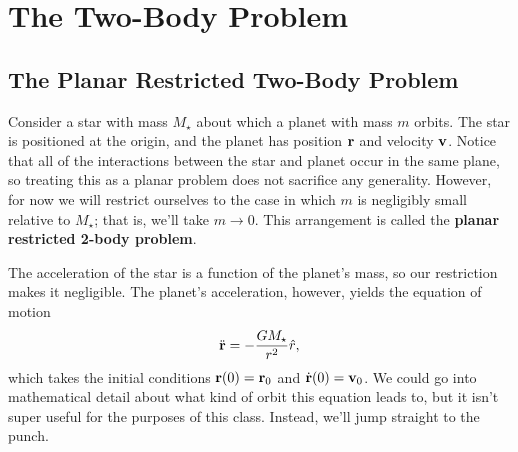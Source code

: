 \documentclass[../a062main.tex]{subfiles}
\begin{document}
\section{The Two-Body Problem}
\subsection*{The Planar Restricted Two-Body Problem}
Consider a star with mass $M_\star$ about which a planet with mass $m$ orbits.
The star is positioned at the origin, and the planet has position $\mathbf{r}$ and velocity $\mathbf{v}$.
Notice that all of the interactions between the star and planet occur in the same plane, so treating this as a planar problem does not sacrifice any generality.
However, for now we will restrict ourselves to the case in which $m$ is negligibly small relative to $M_\star$; that is, we'll take $m \to 0$.
This arrangement is called the \textbf{planar restricted 2-body problem}.

The acceleration of the star is a function of the planet's mass, so our restriction makes it negligible.
The planet's acceleration, however, yields the equation of motion
\[ \ddot{\mathbf{r}} = -\frac{GM_\star}{r^2} \hat{r}, \]
which takes the initial conditions $\mathbf{r}(0) = \mathbf{r}_0$ and $\dot{\mathbf{r}}(0) = \mathbf{v}_0$.
We could go into mathematical detail about what kind of orbit this equation leads to, but it isn't super useful for the purposes of this class.
Instead, we'll jump straight to the punch.
\end{document}
